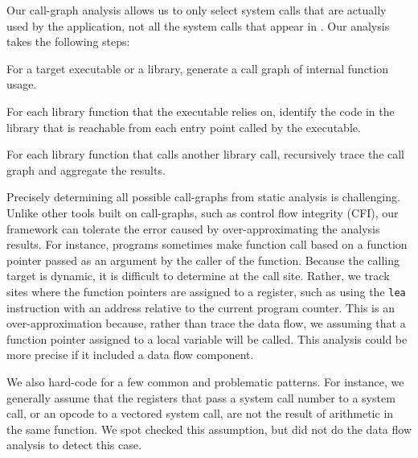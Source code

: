 Our call-graph analysis allows us to only select system calls that are actually used by the application, not all the system calls that appear in \libc{}.
Our analysis takes the following steps:
\begin{compactitem}
\item For a target executable or a library, generate a call graph of internal function usage.
\item For each library function that the executable relies on, identify the code in the library that is reachable from each entry point called by the executable.
\item For each library function that calls another library call, recursively trace the call graph and aggregate the results. 
\end{compactitem}


Precisely determining all possible call-graphs from static analysis is challenging.
Unlike other tools built on 
call-graphs, such as control flow integrity (CFI), our framework can tolerate the error caused by over-approximating the analysis results.
For instance, 
programs sometimes make function call based on a function pointer passed as an argument by the caller of the function. 
Because the calling target is dynamic, it is difficult to determine at the  call site.
Rather, we track sites where the function pointers are assigned to a register, such as using the {\tt lea} instruction with an address
relative to the current program counter.
This is an over-approximation because, rather than trace the data flow, we assuming that a function pointer assigned to a local variable will be called.
This analysis could be more precise if it included a data flow component. 

We also hard-code for a few common and problematic patterns.
For instance, we generally assume that the registers that pass a system call number to a system call,
or an opcode to a vectored system call, are not the result of arithmetic in the same function.
We spot checked this assumption, but did not do the data flow analysis to detect this case.

